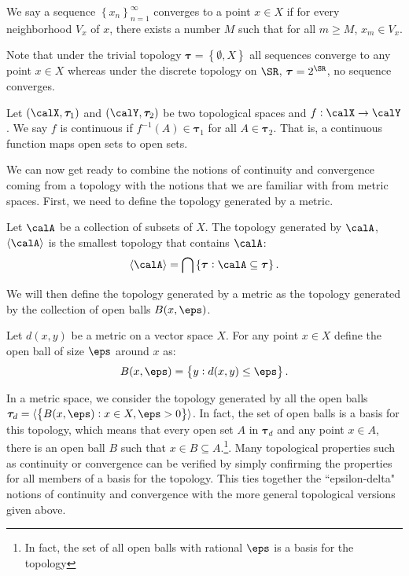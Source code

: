 \begin{definition}[Convergence]
	\label{def:convergence}
	We say a sequence \(\left\{x_n\right\}_{n=1}^\infty\) converges to a point \(x \in X\) if for every neighborhood  \(V_x\) of \(x\), there exists a number  \(M\) such that for all  \(m\geq M\), \(x_m \in V_x\). 
\end{definition}

Note that under the trivial topology \(\boldsymbol{\tau} = \left\{\emptyset, X\right\}\) all sequences converge to any point \(x \in X\) whereas under the discrete topology on  \(\SR\),  \(\boldsymbol{\tau} = 2^\SR\), no sequence converges.


\begin{definition}[Continuity]
	\label{def:continuity}
	Let \((\calX, \boldsymbol{\tau}_1)\) and \((\calY, \boldsymbol{\tau}_2)\) be two topological spaces and \(f:\calX\to\calY\). We say  \(f\) is continuous if  \(f^{-1}(A) \in \boldsymbol{\tau}_1\) for all \(A \in \boldsymbol{\tau}_2\). That is, a continuous function maps open sets to open sets. 
\end{definition}

We can now get ready to combine the notions of continuity and convergence coming from a topology with the notions that we are familiar with from metric spaces. First, we need to define the topology generated by a metric. 

\begin{definition}
	\label{def:generated}
	Let \(\calA\) be a collection of subsets of  \(X\). The topology generated by  \(\calA\), \(\langle\calA\rangle\) is the smallest topology that contains \(\calA\):
	\[
		\langle\calA\rangle = \bigcap \left\{\boldsymbol\tau: \calA\subseteq\boldsymbol{\tau}\right\}
	.\] 
\end{definition}

We will then define the topology generated by a metric as the topology generated by the collection of open balls \(B(x,\eps)\).

\begin{definition}
	\label{def:open-ball}
	Let \(d(x,y)\) be a metric on  a vector space  \(X\). For any point  \(x \in X\) define the open ball of size  \(\eps\) around  \(x\) as:
	\[
		B(x,\eps) = \left\{y: d(x,y) \leq \eps\right\}
	.\] 
\end{definition}

In a metric space, we consider the topology generated by all the open balls \(\boldsymbol{\tau}_d = \langle\left\{B(x,\eps):x \in X, \eps > 0\right\}\rangle\). In fact, the set of open balls is a basis for this topology, which means that every open set \(A\) in \(\boldsymbol{\tau}_d\) and any point \(x \in A\), there is an open ball \(B\) such that  \(x \in B \subseteq A\).\footnote{In fact, the set of all open balls with rational \(\eps\) is a basis for the topology}. Many topological properties such as continuity or convergence can be verified by simply confirming the properties for all members of a basis for the topology. This ties together the ``epsilon-delta" notions of continuity and convergence with the more general topological versions given above.

